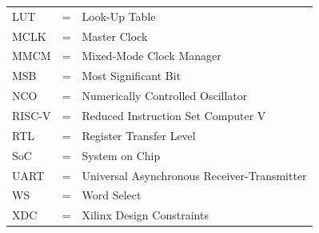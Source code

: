 \begin{tabular}{llp{4in}}
    LUT   & \hspace{1cm} = & Look-Up Table \\
    MCLK  & \hspace{1cm} = & Master Clock \\
    MMCM  & \hspace{1cm} = & Mixed-Mode Clock Manager \\
    MSB   & \hspace{1cm} = & Most Significant Bit \\
    NCO   & \hspace{1cm} = & Numerically Controlled Oscillator \\
    RISC-V& \hspace{1cm} = & Reduced Instruction Set Computer V \\
    RTL   & \hspace{1cm} = & Register Transfer Level \\
    SoC   & \hspace{1cm} = & System on Chip \\
    UART  & \hspace{1cm} = & Universal Asynchronous Receiver-Transmitter \\
    WS    & \hspace{1cm} = & Word Select \\
    XDC   & \hspace{1cm} = & Xilinx Design Constraints \\
\end{tabular}

